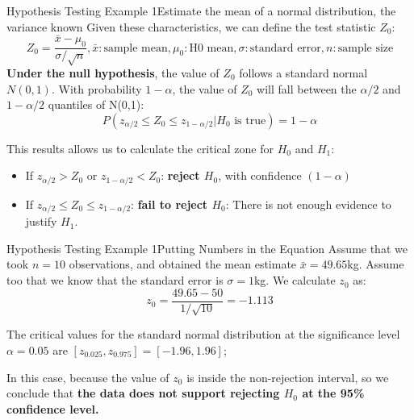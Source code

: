 \begin{frame}{Hypothesis Testing Example 1}{Estimate the mean of a normal distribution, the variance known}
  Given these characteristics, we can define the test statistic $Z_0$:
  \begin{equation*}
    Z_0 = \frac{\bar{x} - \mu_0}{\sigma / \sqrt{n}}, \bar{x}: \text{sample mean}, \mu_0: \text{H0 mean}, \sigma: \text{standard error}, n: \text{sample size}
  \end{equation*}
  {\bf Under the null hypothesis}, the value of ${Z_0}$ follows a standard normal $N(0,1)$. With probability $1-\alpha$, the value of $Z_0$ will fall between the $\alpha/2$ and $1-\alpha/2$ quantiles of N(0,1):
  \begin{equation*}
    P(z_{\alpha/2} \leq Z_0 \leq z_{1-\alpha/2}|H_0\text{ is true}) = 1-\alpha
  \end{equation*}

  This results allows us to calculate the critical zone for $H_0$ and $H_1$:
  \begin{itemize}
    \item If $z_{\alpha/2} > Z_0$ or $z_{1-\alpha/2} < Z_0$: {\bf reject $H_0$}, with confidence $(1-\alpha)$
    \item If $z_{\alpha/2} \leq Z_0 \leq z_{1-\alpha/2}$: {\bf fail to reject $H_0$}: There is not enough evidence to justify $H_1$.
  \end{itemize}
\end{frame}

\begin{frame}{Hypothesis Testing Example 1}{Putting Numbers in the Equation}
  Assume that we took $n=10$ observations, and obtained the mean estimate $\bar{x} = 49.65$kg. Assume too that we know that the standard error is $\sigma = 1$kg. We calculate $z_0$ as:
  \begin{equation*}
    z_0 = \frac{49.65 - 50}{1 / \sqrt{10}} = -1.113
  \end{equation*}\bigskip

  The critical values for the standard normal distribution at the significance level $\alpha = 0.05$ are $[z_{0.025}, z_{0.975}] = [-1.96,1.96]$;\bigskip

  In this case, because the value of $z_0$ is inside the non-rejection interval, so we conclude that {\bf the data does not support rejecting $H_0$ at the 95\% confidence level.}
\end{frame}

